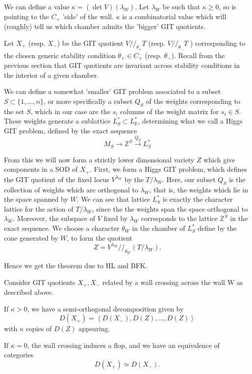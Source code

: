 We can define a value $\kappa = (\det V)(\lambda_W)$. Let $\lambda_W$ be such that $\kappa \geq 0$, so is pointing to the $C_+$ 'side' of the wall. $\kappa$ is a combinatorial value which will (roughly) tell us which chamber admits the 'bigger' GIT quotients. 

Let $X_+$ (resp. $X_-$) be the GIT quotient $V // _{\theta_{+}}T$ (resp. $V // _{\theta_{-}}T$ ) corresponding to the chosen generic stability condition $\theta_{+}\in C_+$ (resp. $\theta_-$).  Recall from the previous section that GIT quotients are invariant across stability conditions in the interior of a given chamber. 

We can define a somewhat 'smaller' GIT problem associated to a subset $S \subset \{ 1,\dots,n \}$, or more specifically a subset $Q_S$ of the weights corresponding to the set $S$, which in our case are the $s_i$ columns of the weight matrix for $s_{i}\in S$. These weights generate a sublattice $L_{S}^{*}\subset L_\mathbb{R}^*$, determining what we call a Higgs GIT problem, defined by the exact sequence $$M_{S}\to \mathbb{Z}^{S}\xrightarrow{Q_{S}}L_{S}^{*}$$

From this we will now form a strictly lower dimensional variety $Z$ which give components in a SOD of $X_+$. First, we form a Higgs GIT problem, which defines the GIT quotient of the fixed locus $V^{\lambda_{W}}$ by the $T/\lambda_W$. Here, our subset $Q_S$  is the collection of weights which are orthogonal to $\lambda_W$, that is, the weights which lie in the space spanned by $W$. We can see that lattice $L_S^*$ is exactly the character lattice for the action of $T/\lambda_W$, since the the weights span the space orthogonal to $\lambda_W$. Moreover, the subspace of $V$ fixed by $\lambda_W$ corresponds to the lattice $\mathbb{Z}^S$ in the exact sequence. We choose a character $\theta_W$ in the chamber of $L_{S}^*$ define by the cone generated by $W$, to form the quotient $$Z = V^{\lambda_{W}} / /_{\theta_{W}} \left( T/ \lambda_{W}\right) . $$

Hence we get the theorem due to HL and BFK.

\begin{theorem}{}{}
    Consider GIT quotients $X_{+},X_{-}$  related by a wall crossing across the wall W as described above. 

If $\kappa > 0$, we have a semi-orthogonal decomposition given by $$D(X_{+}) = \left< D(X_{-}),D(Z) , \dots, D(Z)  \right>$$with $\kappa$ copies of $D(Z)$ appearing.

If $\kappa = 0$, the wall crossing induces a flop, and we have an equivalence of categories $$D(X_{+})\simeq D(X_-).$$
\end{theorem}

